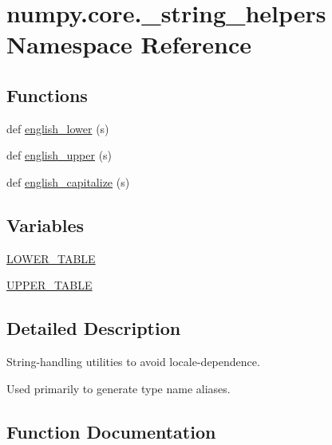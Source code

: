\hypertarget{namespacenumpy_1_1core_1_1__string__helpers}{}\section{numpy.\+core.\+\_\+string\+\_\+helpers Namespace Reference}
\label{namespacenumpy_1_1core_1_1__string__helpers}
\subsection*{Functions}
\begin{DoxyCompactItemize}
\item 
def \hyperlink{namespacenumpy_1_1core_1_1__string__helpers_aaa1d620a85b4e2b18d4bb6d837e81332}{english\+\_\+lower} (s)
\item 
def \hyperlink{namespacenumpy_1_1core_1_1__string__helpers_a3ff87ea2ea25d9de1f54a279dd16d329}{english\+\_\+upper} (s)
\item 
def \hyperlink{namespacenumpy_1_1core_1_1__string__helpers_a6659d04de7679ff46ff9133ed915857c}{english\+\_\+capitalize} (s)
\end{DoxyCompactItemize}
\subsection*{Variables}
\begin{DoxyCompactItemize}
\item 
\hyperlink{namespacenumpy_1_1core_1_1__string__helpers_a8510a742099911a611dca468e32de5db}{L\+O\+W\+E\+R\+\_\+\+T\+A\+B\+LE}
\item 
\hyperlink{namespacenumpy_1_1core_1_1__string__helpers_a3b0221f59c4bd35f2df385fc2f5da240}{U\+P\+P\+E\+R\+\_\+\+T\+A\+B\+LE}
\end{DoxyCompactItemize}


\subsection{Detailed Description}
\begin{DoxyVerb}String-handling utilities to avoid locale-dependence.

Used primarily to generate type name aliases.
\end{DoxyVerb}
 

\subsection{Function Documentation}
\mbox{\label{namespacenumpy_1_1core_1_1__string__helpers_a6659d04de7679ff46ff9133ed915857c}} 

